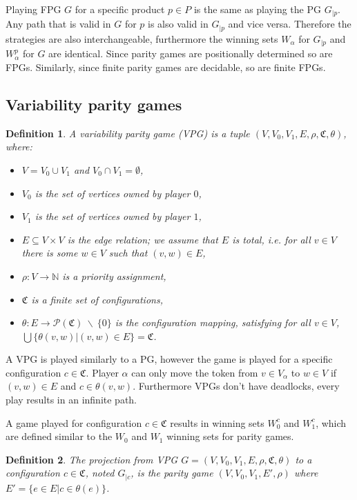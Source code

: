 \documentclass[]{article}
\newtheorem{definition}{Definition}[section]
\begin{document}
Playing FPG $G$ for a specific product $p\in P$ is the same as playing the PG $G_{|p}$. Any path that is valid in $G$ for $p$ is also valid in $G_{|p}$ and vice versa. Therefore the strategies are also interchangeable, furthermore the winning sets $W_\alpha$ for $G_{|p}$ and $W_\alpha^p$ for $G$ are identical. Since parity games are positionally determined so are FPGs. Similarly, since finite parity games are decidable, so are finite FPGs.

\subsection{Variability parity games}
\begin{definition}
	\label{def_VPG}
	A variability parity game (VPG) is a tuple $(V,V_0, V_1, E, \rho, \mathfrak{C}, \theta)$, where:
	\begin{itemize}
		\item $V = V_0 \cup V_1$ and $V_0 \cap V_1 = \emptyset$,
		\item $V_0$ is the set of vertices owned by player $0$,
		\item $V_1$ is the set of vertices owned by player $1$, 
		\item $E \subseteq V \times V$ is the edge relation; we assume that $E$ is total, i.e. for all $v\in V$ there is some $w \in V$ such that $(v,w) \in E$,
		\item $\rho :  V \rightarrow \mathbb{N}$ is a priority assignment,
		\item $\mathfrak{C}$ is a finite set of configurations,
		\item $\theta : E \rightarrow \mathcal{P}(\mathfrak{C})\ \backslash\ \{0\}$ is the configuration mapping, satisfying for all $v \in V$, $\bigcup\{\theta(v,w)|(v,w) \in E\} = \mathfrak{C}$.
	\end{itemize}
\end{definition}
A VPG is played similarly to a PG, however the game is played for a specific configuration $c \in \mathfrak{C}$. Player $\alpha$ can only move the token from $v \in V_\alpha$ to $w \in V$ if $(v,w) \in E$ and $c \in \theta(v,w)$. Furthermore VPGs don't have deadlocks, every play results in an infinite path.

A game played for configuration $c \in \mathfrak{C}$ results in winning sets $W_0^c$ and $W_1^c$, which are defined similar to the $W_0$ and $W_1$ winning sets for parity games.

\begin{definition}
	\label{def_VPG_proj} The projection from VPG $G = (V, V_0, V_1, E, \rho, \mathfrak{C}, \theta)$ to a configuration $c \in \mathfrak{C}$, noted $G_{|c}$, is the parity game $(V, V_0, V_1, E', \rho)$ where $E' = \{ e\in E | c \in \theta(e)\}$.
\end{definition}
\end{document}
